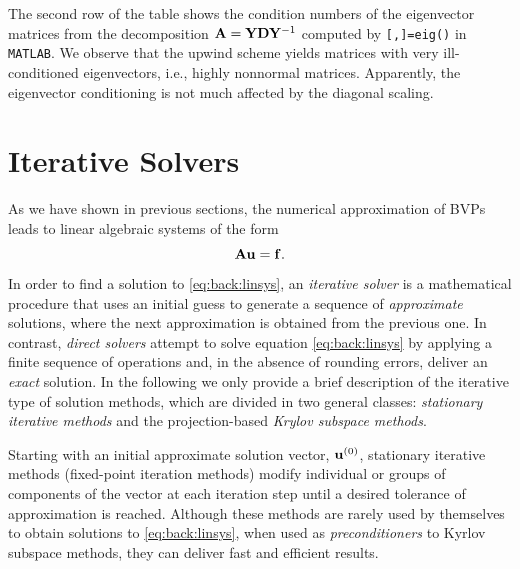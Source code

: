 The second row of the table shows the condition numbers of the eigenvector
matrices from the decomposition $\mathbf{A}=\mathbf{Y}\mathbf{D}\mathbf{Y}^{-1}$ computed by
\texttt{[\Y,\D]=eig(\A)} in \texttt{MATLAB}. We observe that the upwind scheme
yields matrices with very ill-conditioned eigenvectors, i.e., highly nonnormal
matrices. Apparently, the eigenvector conditioning is not much affected by the
diagonal scaling.

\section{Iterative Solvers}
\label{back:itersolvers}

As we have shown in previous sections, the numerical approximation of BVPs
leads to linear algebraic systems of the form
\begin{equation}
\mathbf{A}\mathbf{u}=\mathbf{f}.
\label{eq:back:linsys}
\end{equation}
In order to find a solution to \eqref{eq:back:linsys}, an
\emph{iterative solver} is a  mathematical procedure that uses an initial
guess to generate a sequence of \emph{approximate} solutions, where the next
approximation is obtained from the previous one. In contrast, \emph{direct solvers} attempt to solve equation \eqref{eq:back:linsys} by
applying a finite sequence of operations and, in the absence of rounding
errors, deliver an \emph{exact} solution. In the following we only provide a brief description of the iterative type of solution methods, which are divided in two general classes: \textit{stationary iterative methods} and the projection-based \textit{Krylov subspace methods}.

Starting with an initial approximate solution vector, $\mathbf{u}^{(0)}$, stationary
iterative methods (fixed-point iteration methods) modify individual or groups
of components of the vector at each iteration step until a desired tolerance of
approximation is reached. Although these methods are rarely used by themselves to obtain solutions to \eqref{eq:back:linsys}, when used as \emph{preconditioners} to Kyrlov subspace methods, they can deliver fast and efficient results.

